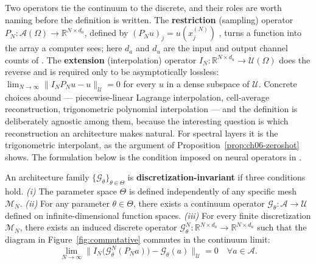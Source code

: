 Two operators tie the continuum to the discrete, and their roles are worth
naming before the definition is written. The \textbf{restriction} (sampling)
operator $P_N : \mathcal{A}(\Omega) \to \mathbb{R}^{N \times d_a}$, defined by
$(P_N u)_j = u(x_j^{(N)})$ ,
turns a function into the array a computer sees; here $d_a$ and $d_u$ are the
input and output channel counts of
. The
\textbf{extension}
(interpolation) operator $I_N : \mathbb{R}^{N \times d_u} \to \mathcal{U}(\Omega)$
does the reverse and is required only to be asymptotically lossless:
$\lim_{N \to \infty} \|I_N P_N u - u\|_{\mathcal{U}} = 0$ for every $u$ in a
dense subspace of $\mathcal{U}$. Concrete choices abound --- piecewise-linear
Lagrange interpolation, cell-average reconstruction, trigonometric polynomial
interpolation --- and the definition is deliberately agnostic among them,
because the interesting question is which reconstruction an architecture makes
natural. For spectral layers it is the trigonometric interpolant, as the
argument of Proposition~\ref{prop:ch06-zeroshot} shows. The formulation below is
the condition imposed on neural operators in \cite{kovachki2023neural}.

\begin{definition}
\label{def:ch06-discretization-invariance}
An architecture family $\{\mathcal{G}_\theta\}_{\theta \in \Theta}$ is
\textbf{discretization-invariant} if three conditions hold. \emph{(i)} The
parameter space $\Theta$ is defined independently of any specific mesh
$\mathcal{M}_N$. \emph{(ii)} For any parameter $\theta \in \Theta$, there exists
a continuum operator $\mathcal{G}_\theta : \mathcal{A} \to \mathcal{U}$ defined
on infinite-dimensional function spaces. \emph{(iii)} For every finite
discretization $\mathcal{M}_N$, there exists an induced discrete operator
$\mathcal{G}_\theta^N : \mathbb{R}^{N \times d_a} \to \mathbb{R}^{N \times d_u}$
such that the diagram in Figure~\ref{fig:commutative} commutes in the continuum
limit:
\begin{equation}
  \label{eq:limit_commute}
  \lim_{N \to \infty} \| I_N \big( \mathcal{G}_\theta^N(P_N a) \big) - \mathcal{G}_\theta(a) \|_{\mathcal{U}} = 0 \quad \forall a \in \mathcal{A}.
\end{equation}
\end{definition}

